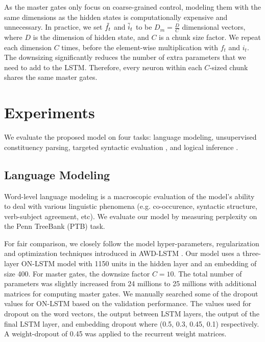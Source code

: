 \documentclass{article} \usepackage{iclr2019_conference,times}
\begin{document}
As the master gates only focus on coarse-grained control, modeling them with the same dimensions as the hidden states is computationally expensive and unnecessary.
In practice, we set $\Tilde{f}_{t}$ and $\Tilde{i}_{t}$ to be $D_m = \frac{D}{C}$ dimensional vectors, where $D$ is the dimension of hidden state, and $C$ is a chunk size factor.
We repeat each dimension $C$ times, before the element-wise multiplication with $f_t$ and $i_t$. The downsizing significantly reduces the number of extra parameters that we need to add to the LSTM. 
Therefore, every neuron within each $C$-sized chunk shares the same master gates.



%
 
\section{Experiments}
We evaluate the proposed model on four tasks: language modeling, unsupervised constituency parsing, targeted syntactic evaluation \citep{marvin2018targeted}, and logical inference \citep{bowman2015tree}.

\subsection{Language Modeling}
Word-level language modeling is a macroscopic evaluation of the model's ability to deal with various linguistic phenomena (e.g. co-occurence, syntactic structure, verb-subject agreement, etc).
We evaluate our model by measuring perplexity on the Penn TreeBank (PTB) \citep{marcus1993building, mikolov2012statistical} task.

For fair comparison, we closely follow the model hyper-parameters, regularization and optimization techniques introduced in AWD-LSTM \citep{merityRegOpt}.
Our model uses a three-layer ON-LSTM model with 1150 units in the hidden layer and an embedding of size 400. 
For master gates, the downsize factor $C=10$.
The total number of parameters was slightly increased from 24 millions to 25 millions with additional matrices for computing master gates.
We manually searched some of the dropout values for ON-LSTM based on the validation performance.
The values used for dropout on the word vectors, the output between LSTM layers, the output of the final LSTM layer, and embedding dropout where (0.5, 0.3, 0.45, 0.1) respectively. 
A weight-dropout of 0.45 was applied to the recurrent weight matrices.
\end{document}
